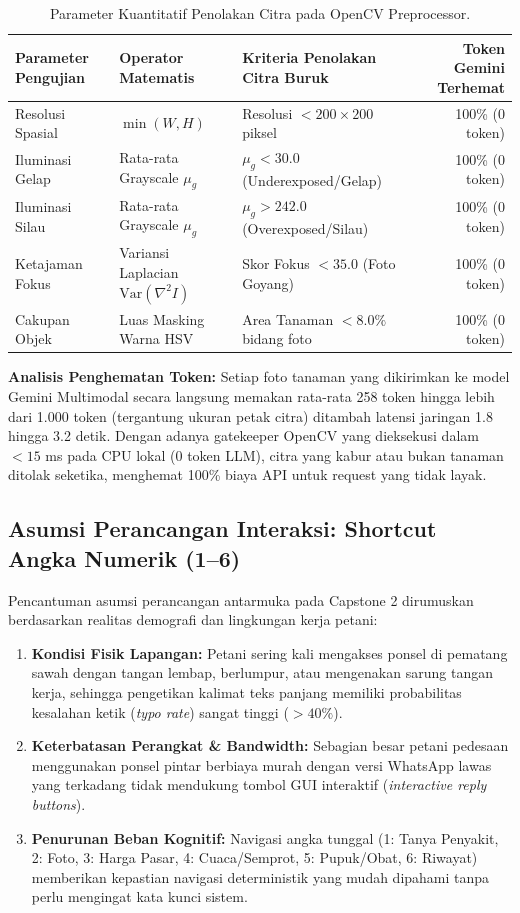\documentclass[11pt,a4paper]{article}
\begin{document}
\begin{table}[htbp]
\centering
\caption{Parameter Kuantitatif Penolakan Citra pada OpenCV Preprocessor.}
\label{tab:opencv_thresholds}
\begin{tabularx}{\textwidth}{l p{3.5cm} X r}
\toprule
\textbf{Parameter Pengujian} & \textbf{Operator Matematis} & \textbf{Kriteria Penolakan Citra Buruk} & \textbf{Token Gemini Terhemat} \\
\midrule
Resolusi Spasial & $\min(W, H)$ & Resolusi $< 200 \times 200$ piksel & 100\% (0 token) \\
Iluminasi Gelap & Rata-rata Grayscale $\mu_g$ & $\mu_g < 30.0$ (Underexposed/Gelap) & 100\% (0 token) \\
Iluminasi Silau & Rata-rata Grayscale $\mu_g$ & $\mu_g > 242.0$ (Overexposed/Silau) & 100\% (0 token) \\
Ketajaman Fokus & Variansi Laplacian $\text{Var}(\nabla^2 I)$ & Skor Fokus $< 35.0$ (Foto Goyang) & 100\% (0 token) \\
Cakupan Objek & Luas Masking Warna HSV & Area Tanaman $< 8.0\%$ bidang foto & 100\% (0 token) \\
\bottomrule
\end{tabularx}
\end{table}

\noindent
\textbf{Analisis Penghematan Token:} Setiap foto tanaman yang dikirimkan ke model Gemini Multimodal secara langsung memakan rata-rata 258 token hingga lebih dari 1.000 token (tergantung ukuran petak citra) ditambah latensi jaringan 1.8 hingga 3.2 detik. Dengan adanya gatekeeper OpenCV yang dieksekusi dalam $< 15$ ms pada CPU lokal ($0$ token LLM), citra yang kabur atau bukan tanaman ditolak seketika, menghemat 100\% biaya API untuk request yang tidak layak.

\subsection{Asumsi Perancangan Interaksi: Shortcut Angka Numerik (1--6)}
Pencantuman asumsi perancangan antarmuka pada Capstone 2 dirumuskan berdasarkan realitas demografi dan lingkungan kerja petani:
\begin{enumerate}
    \item \textbf{Kondisi Fisik Lapangan:} Petani sering kali mengakses ponsel di pematang sawah dengan tangan lembap, berlumpur, atau mengenakan sarung tangan kerja, sehingga pengetikan kalimat teks panjang memiliki probabilitas kesalahan ketik (\textit{typo rate}) sangat tinggi ($> 40\%$).
    \item \textbf{Keterbatasan Perangkat \& Bandwidth:} Sebagian besar petani pedesaan menggunakan ponsel pintar berbiaya murah dengan versi WhatsApp lawas yang terkadang tidak mendukung tombol GUI interaktif (\textit{interactive reply buttons}).
    \item \textbf{Penurunan Beban Kognitif:} Navigasi angka tunggal (1: Tanya Penyakit, 2: Foto, 3: Harga Pasar, 4: Cuaca/Semprot, 5: Pupuk/Obat, 6: Riwayat) memberikan kepastian navigasi deterministik yang mudah dipahami tanpa perlu mengingat kata kunci sistem.
\end{enumerate}
\end{document}
